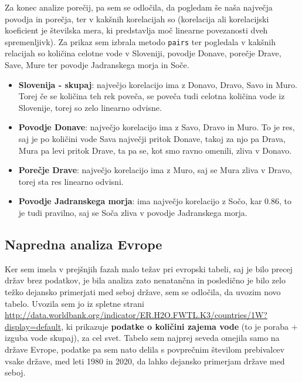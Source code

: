 \documentclass[11pt,a4paper]{article}
\begin{document}
\newpage

Za konec analize porečij, pa sem se odločila, da pogledam še naša največja povodja in porečja, ter v kakšnih korelacijah so (korelacija ali korelacijski koeficient je številska mera, ki predstavlja moč linearne povezanosti dveh spremenljivk). Za prikaz sem izbrala metodo \verb|pairs| ter pogledala v kakšnih relacijah so količina celotne vode v Sloveniji, povodje Donave, porečje Drave, Save, Mure ter povodje Jadranskega morja in Soče.


\begin{itemize}
\item{\textbf{Slovenija - skupaj}: največjo korelacijo ima z Donavo, Dravo, Savo in Muro. Torej če se količina teh rek poveča, se poveča tudi celotna količina vode iz Slovenije, torej so zelo linearno odvisne.}

\item{\textbf{Povodje Donave}: največjo korelacijo ima z Savo, Dravo in Muro. To je res, saj je po količini vode Sava največji pritok Donave, takoj za njo pa Drava, Mura pa levi pritok Drave, ta pa se, kot smo ravno omenili, zliva v Donavo.}

\item{\textbf{Porečje Drave}: največjo korelacijo ima z Muro, saj se Mura zliva v Dravo, torej sta res linearno odvisni.}

\item{\textbf{Povodje Jadranskega morja}: ima največjo korelacijo z Sočo, kar 0.86, to je tudi pravilno, saj se Soča zliva v povodje Jadranskega morja.}
\end{itemize}

\newpage
\subsection{Napredna analiza Evrope}
Ker sem imela v prejšnjih fazah malo težav pri evropski tabeli, saj je bilo precej držav brez podatkov, je bila analiza zato nenatančna in posledično je bilo zelo težko dejansko primerjati med seboj države, sem se odločila, da uvozim novo tabelo. Uvozila sem jo iz spletne strani \url{http://data.worldbank.org/indicator/ER.H2O.FWTL.K3/countries/1W?display=default}, ki prikazuje \textbf{podatke o količini zajema vode} (to je poraba + izguba vode skupaj), za cel svet. Tabelo sem najprej seveda omejila samo na države Evrope, podatke pa sem nato delila s povprečnim številom prebivalcev vsake države, med leti 1980 in 2020, da lahko dejansko primerjam države med seboj.\\
\end{document}
